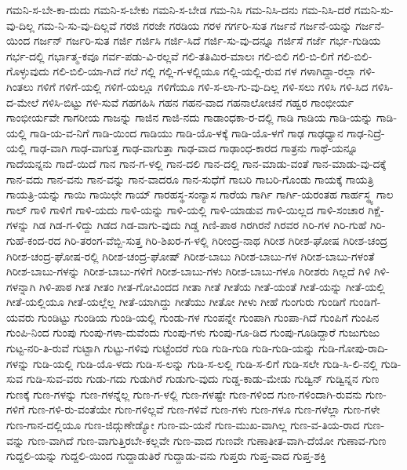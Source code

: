 ಗಮನಿ-ಸ-ಬೇ-ಕಾ-ದುದು
ಗಮನಿ-ಸ-ಬೇಕು
ಗಮನಿ-ಸ-ಬೇಡ
ಗಮ-ನಿಸಿ
ಗಮ-ನಿಸಿ-ದನು
ಗಮ-ನಿಸಿ-ದರೆ
ಗಮನಿ-ಸು-ವು-ದಿಲ್ಲ
ಗಮ-ನಿ-ಸು-ವು-ದಿಲ್ಲವೆ
ಗರಜಿ
ಗರಜೇ
ಗರಡಿಯ
ಗರಳ
ಗರ್ಗರಿ-ಸುತ
ಗರ್ಜನೆ
ಗರ್ಜನೆ-ಯನ್ನು
ಗರ್ಜನೆ-ಯಿಂದ
ಗರ್ಜನ್
ಗರ್ಜರಿ-ಸುತ
ಗರ್ಜಿ
ಗರ್ಜಿಸಿ
ಗರ್ಜಿ-ಸಿದೆ
ಗರ್ಜಿ-ಸು-ವು-ದನ್ನೂ
ಗರ್ಜಿಸೆ
ಗರ್ಜೆ
ಗರ್ಭ-ಗುಡಿಯ
ಗರ್ಭ-ದಲ್ಲಿ
ಗರ್ಭಾತ್ಮ-ಕವೂ
ಗರ್ವ-ಪಡು-ವಿ-ರಲ್ಲವೆ
ಗಲಿ-ತತಿಮಿರ-ಮಾಲಃ
ಗಲಿ-ಬಿಲಿ
ಗಲಿ-ಬಿ-ಲಿಗೆ
ಗಲಿ-ಬಿಲಿ-ಗೊಳ್ಳುವುದು
ಗಲಿ-ಬಿಲಿ-ಯಾ-ಗಿದೆ
ಗಲೆ
ಗಲ್ಲಿ
ಗಲ್ಲಿ-ಗ-ಳಲ್ಲಿಯೂ
ಗಲ್ಲಿ-ಯಲ್ಲಿ-ರುವ
ಗಳ
ಗಳಾಗಿದ್ದಾ-ರಲ್ಲಾ
ಗಳಿ-ಗಿಂತಲು
ಗಳಿಗೆ
ಗಳಿಗೆ-ಯಲ್ಲಿ
ಗಳಿಗೆ-ಯಲ್ಲೂ
ಗಳಿಗೆಯೂ
ಗಳಿ-ಸ-ಲಾ-ಗು-ವು-ದಿಲ್ಲ
ಗಳಿ-ಸಲು
ಗಳಿಸಿ
ಗಳಿ-ಸಿದ
ಗಳಿಸಿ-ದ-ಮೇಲೆ
ಗಳಿಸಿ-ಬಿಟ್ಟು
ಗಳಿ-ಸುವೆ
ಗಹಗಹಿಸಿ
ಗಹನ
ಗಹನ-ವಾದ
ಗಹನಾಲೋಚನೆ
ಗಹ್ವರ
ಗಾಂಭೀರ್ಯ
ಗಾಂಭೀರ್ಯವೇ
ಗಾಗರೀಯ
ಗಾಜನ್ನು
ಗಾಜಿನ
ಗಾಜಿ-ನದು
ಗಾಡಾಂಧಕಾ-ರ-ದಲ್ಲಿ
ಗಾಡಿ
ಗಾಡಿಯ
ಗಾಡಿ-ಯನ್ನು
ಗಾಡಿ-ಯಲ್ಲಿ
ಗಾಡಿ-ಯ-ವ-ನಿಗೆ
ಗಾಡಿ-ಯಿಂದ
ಗಾಡಿಯು
ಗಾಡಿ-ಯೊ-ಳಕ್ಕೆ
ಗಾಡಿ-ಯೊ-ಳಗೆ
ಗಾಢ
ಗಾಢಧ್ಯಾನ
ಗಾಢ-ನಿದ್ರೆ-ಯಲ್ಲಿ
ಗಾಢ-ವಾಗಿ
ಗಾಢ-ವಾಗುತ್ತ
ಗಾಢ-ವಾಗುತ್ತಾ
ಗಾಢ-ವಾದ
ಗಾಢಾಂಧ-ಕಾರದ
ಗಾತ್ರನು
ಗಾಥೆ-ಯನ್ನೂ
ಗಾದೆಯನ್ನನು
ಗಾದೆ-ಯಿದೆ
ಗಾನ
ಗಾನ-ಗ-ಳಲ್ಲಿ
ಗಾನ-ದಲಿ
ಗಾನ-ದಲ್ಲಿ
ಗಾನ-ಮಾಡು-ವಂತೆ
ಗಾನ-ಮಾಡು-ವು-ದಕ್ಕೆ
ಗಾನ-ವದು
ಗಾನ-ವನು
ಗಾನ-ವನ್ನು
ಗಾನ-ವಾದರೂ
ಗಾನ-ಸುಧೆಗೆ
ಗಾಬರಿ
ಗಾಬರಿ-ಗೊಂಡು
ಗಾಯಕ್ಕೆ
ಗಾಯತ್ರಿ
ಗಾಯತ್ರಿ-ಯನ್ನು
ಗಾಯಿ
ಗಾಯಿಛೇ
ಗಾಯ್
ಗಾರಹಸ್ಥ-ಸಂನ್ಯಾಸ
ಗಾರೆಯ
ಗಾರ್ಗಿ
ಗಾರ್ಗಿ-ಯರಂತಹ
ಗಾರ್ಹಸ್ಥ್ಯ
ಗಾಲ
ಗಾಲ್
ಗಾಳಿ
ಗಾಳಿಗೆ
ಗಾಳಿ-ಯದು
ಗಾಳಿ-ಯನ್ನು
ಗಾಳಿ-ಯಲ್ಲಿ
ಗಾಳಿ-ಯಾಡುವ
ಗಾಳಿ-ಯಿಲ್ಲದ
ಗಾಳಿ-ಸಂಚಾರ
ಗಿಕ್ಷೆ-ಗಳನ್ನು
ಗಿಡ
ಗಿಡ-ಗ-ಳಿದ್ದು
ಗಿಡದ
ಗಿಡ-ವಾಗು-ವುದು
ಗಿಡ್ಡ
ಗಿಣಿ-ಪಾಠ
ಗಿರಗಿರನೆ
ಗಿರವರ
ಗಿರಿ-ಗಳ
ಗಿರಿ-ಗುಹೆ
ಗಿರಿ-ಗುಹೆ-ಕಂದ-ರದ
ಗಿರಿ-ತರಂಗ-ವೆಬ್ಬಿ-ಸುತ್ತ
ಗಿರಿ-ಶಿಖರ-ಗ-ಳಲ್ಲಿ
ಗಿರೀಂದ್ರ-ನಾಥ
ಗಿರೀಶ
ಗಿರೀಶ-ಘೋಷ
ಗಿರೀಶ-ಚಂದ್ರ
ಗಿರೀಶ-ಚಂದ್ರ-ಘೋಷ-ರಲ್ಲಿ
ಗಿರೀಶ-ಚಂದ್ರ-ಘೋಷ್
ಗಿರೀಶ-ಬಾಬು
ಗಿರೀಶ-ಬಾಬು-ಗಳ
ಗಿರೀಶ-ಬಾಬು-ಗಳಂತೆ
ಗಿರೀಶ-ಬಾಬು-ಗಳನ್ನು
ಗಿರೀಶ-ಬಾಬು-ಗಳಿಗೆ
ಗಿರೀಶ-ಬಾಬು-ಗಳು
ಗಿರೀಶ-ಬಾಬು-ಗಳೂ
ಗಿರೀಶರು
ಗಿಲ್ಲದೆ
ಗಿಳಿ
ಗಿಳಿ-ಗಳನ್ನಾಗಿ
ಗಿಳಿ-ಪಾಠ
ಗೀತ
ಗೀತಂ
ಗೀತ-ಗೋವಿಂದದ
ಗೀತಾ
ಗೀತೆ
ಗೀತೆಯ
ಗೀತೆ-ಯಂತೆ
ಗೀತೆ-ಯನ್ನು
ಗೀತೆ-ಯಲ್ಲಿ
ಗೀತೆ-ಯಲ್ಲಿಯೂ
ಗೀತೆ-ಯಲ್ಲೆಲ್ಲ
ಗೀತೆ-ಯಾಗಿದ್ದು
ಗೀತೆಯು
ಗೀತೋ
ಗೀಳು
ಗೀಹೆ
ಗುಂಗುರು
ಗುಂಡಿಗೆ
ಗುಂಡಿಗೆ-ಯವರು
ಗುಂಡಿಟ್ಟು
ಗುಂಡಿಯ
ಗುಂಡಿ-ಯಲ್ಲಿ
ಗುಂಡು-ಗಳ
ಗುಂಪನ್ನೇ
ಗುಂಪಾಗಿ
ಗುಂಪಾ-ಗಿದೆ
ಗುಂಪಿಗೆ
ಗುಂಪಿನ
ಗುಂಪಿ-ನಿಂದ
ಗುಂಪು
ಗುಂಪು-ಗಳಾ-ದುವೆಂದು
ಗುಂಪು-ಗಳು
ಗುಂಪು-ಗೂ-ಡಿದ
ಗುಂಪು-ಗೂಡಿದ್ದಾರೆ
ಗುಜುಗುಜು
ಗುಟ್ಟ-ನರಿ-ತಿ-ರುವೆ
ಗುಟ್ಟಾಗಿ
ಗುಟ್ಟು-ಗಳಿವು
ಗುಟ್ಟೆಂದರೆ
ಗುಡಿ
ಗುಡಿ-ಗುಡಿ
ಗುಡಿ-ಗುಡಿ-ಯನ್ನು
ಗುಡಿ-ಗೋಪು-ರಾದಿ-ಗಳನ್ನು
ಗುಡಿ-ಯಲ್ಲಿ
ಗುಡಿ-ಯೊ-ಳದು
ಗುಡಿ-ಸ-ಲನ್ನು
ಗುಡಿ-ಸ-ಲಲ್ಲಿ
ಗುಡಿ-ಸ-ಲಿಗೆ
ಗುಡಿ-ಸಲೇ
ಗುಡಿ-ಸಿ-ಲಿ-ನಲ್ಲಿ
ಗುಡಿ-ಸುವ
ಗುಡಿ-ಸುವ-ವರು
ಗುಡು-ಗದು
ಗುಡುಗಿರೆ
ಗುಡುಗು-ವುದು
ಗುಡ್ಡ-ಕಾಡು-ಮೇಡು
ಗುಡ್ವಿನ್
ಗುಡ್ವಿನ್ನನ
ಗುಣ
ಗುಣಕ್ಕೆ
ಗುಣ-ಗಳನ್ನು
ಗುಣ-ಗಳನ್ನೆಲ್ಲ
ಗುಣ-ಗ-ಳಲ್ಲಿ
ಗುಣ-ಗಳಷ್ಟೇ
ಗುಣ-ಗಳಿಂದ
ಗುಣ-ಗಳಿಂದಾಗಿ-ರುವನು
ಗುಣ-ಗಳಿಗೆ
ಗುಣ-ಗಳಿ-ರು-ವಂತೆಯೇ
ಗುಣ-ಗಳಿಲ್ಲವೆ
ಗುಣ-ಗಳಿವೆ
ಗುಣ-ಗಳು
ಗುಣ-ಗಳೂ
ಗುಣ-ಗಳೆಲ್ಲಾ
ಗುಣ-ಗಳೇ
ಗುಣ-ಗಾನ-ದಲ್ಲಿಯೂ
ಗುಣ-ಜಿದ್ಗುಣೇಡ್ಯೋ
ಗುಣ-ಮ-ಯನೆ
ಗುಣ-ಮುಖ-ವಾಗಿಲ್ಲ
ಗುಣ-ವ-ತಿಯ-ರಾದ
ಗುಣ-ವನ್ನು
ಗುಣ-ವಾಗಿದೆ
ಗುಣ-ವಾಗುತ್ತಿರಬೇ-ಕಲ್ಲವೇ
ಗುಣ-ವಾದ
ಗುಣವೇ
ಗುಣಾತೀತ-ವಾಗಿ-ದೆಯೋ
ಗುಣಾವ-ಗುಣ
ಗುದ್ದಲಿ-ಯನ್ನು
ಗುದ್ದಲಿ-ಯಿಂದ
ಗುದ್ದಾಡುತಿರೆ
ಗುದ್ದಾಡು-ವನು
ಗುಪ್ತರು
ಗುಪ್ತ-ವಾದ
ಗುಪ್ತ-ಶಕ್ತಿ
